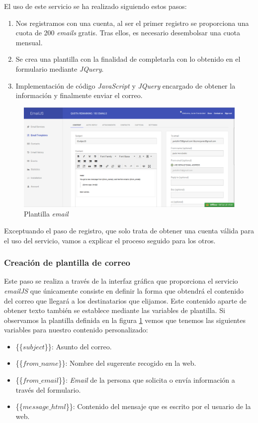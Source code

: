 El uso de este servicio se ha realizado siguiendo estos pasos:
\begin{enumerate}
    \item Nos registramos con una cuenta, al ser el primer registro se proporciona una cuota de 200 \textit{emails} gratis. Tras ellos, es necesario desembolsar una cuota mensual.
    \item Se crea una plantilla con la finalidad de completarla con lo obtenido en el formulario mediante \textit{JQuery}.
    \item Implementación de código \textit{JavaScript} y \textit{JQuery} encargado de obtener la información y finalmente enviar el correo.
\end{enumerate}

\begin{figure}[H]
    \centering
    \includegraphics[width=\textwidth]{img/email_template.png}
    \caption{Plantilla \textit{email}}
    \label{fig:emailTemplate}
\end{figure}

Exceptuando el paso de registro, que solo trata de obtener una cuenta válida para el uso del servicio, vamos a explicar el proceso seguido para los otros. 

\subsubsection*{Creación de plantilla de correo}
Este paso se realiza a través de la interfaz gráfica que proporciona el servicio \textit{emailJS} que únicamente consiste en definir la forma que obtendrá el contenido del correo que llegará a los destinatarios que elijamos. Este contenido aparte de obtener texto también se establece mediante las variables de plantilla. Si observamos la plantilla definida en la figura \ref{fig:emailTemplate} vemos que tenemos las siguientes variables para nuestro contenido personalizado:
\begin{itemize}
    \item \{\{$subject$\}\}: Asunto del correo.
    \item \{\{$from\_name$\}\}: Nombre del sugerente recogido en la web. 
    \item \{\{$from\_email$\}\}: \textit{Email} de la persona que solicita o envía información a través del formulario.
    \item \{\{$message\_html$\}\}: Contenido del mensaje que es escrito por el usuario de la web.
\end{itemize}

